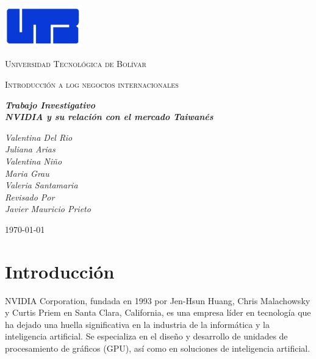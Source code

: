 \documentclass[twocolumn, 12pt]{article}
\begin{document}
\begin{titlepage}
      \centering
      \includegraphics[width=0.25\textwidth]{Images/Imagen1.jpg}\par\vspace{1cm}
      {\scshape\LARGE Universidad Tecnológica de Bolívar \par}
      \vspace{.5cm}

      {\scshape\Large Introducción a log negocios internacionales \par}
      \vspace{.2cm}

      \slshape {\Large \bfseries{}Trabajo Investigativo\\}
      \slshape {\small \bfseries{}NVIDIA y su relación con el mercado Taiwanés}
      \vspace{1cm}

      \slshape {\itshape{} Valentina Del Rio \\}
      \slshape {\itshape{} Juliana Arias \\}
      \slshape {\itshape{} Valentina Niño \\}
      \slshape {\itshape{} Maria Grau \\}
      \slshape {\itshape{} Valeria Santamaria \\}
      \vfill
      Revisado Por \\
      Javier Mauricio Prieto \\
      {\large \today\par}
\end{titlepage}


\nocite{*}

\section{Introducción}

NVIDIA Corporation, fundada en 1993 por Jen-Hsun Huang, Chris
Malachowsky y Curtis Priem en Santa Clara, California, es una
empresa líder en tecnología que ha dejado una huella
significativa en la industria de la informática y la
inteligencia artificial. Se especializa en el diseño y
desarrollo de unidades de procesamiento de gráficos (GPU),
así como en soluciones de inteligencia artificial.
\end{document}
